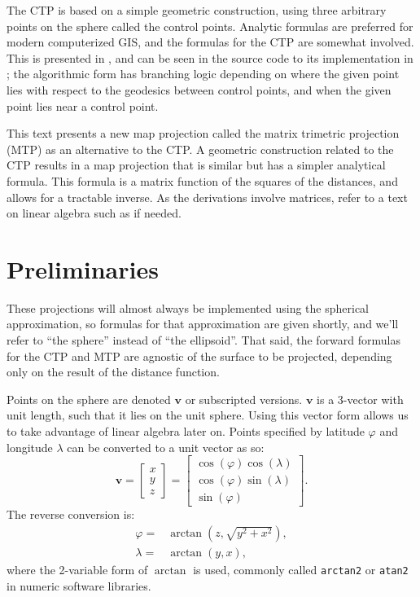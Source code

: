 \documentclass[]{interact}
\begin{document}
The CTP is based on a simple geometric construction, using three arbitrary
points on the sphere called the control points. Analytic formulas are preferred
for modern computerized GIS, and the formulas for the CTP are somewhat involved.
This is presented in \citet{christensen}, and can be seen in the source code to
its implementation in \citet{proj}; the algorithmic form has branching logic
depending on where the given point lies with respect to the geodesics between
control points, and when the given point lies near a control point.

This text presents a new map projection called the matrix trimetric projection
(MTP) as an alternative to the CTP. A geometric construction related to the
CTP results in a map projection that is similar but has a simpler analytical
formula. This formula is a matrix function of the squares of the distances, and
allows for a tractable inverse. As the derivations involve matrices,
refer to a text on linear algebra such as \citet{strang80} if needed.

\section{Preliminaries}
These projections will almost always be implemented using the spherical
approximation, so formulas for that approximation are given shortly, and we'll
refer to ``the sphere'' instead of ``the ellipsoid''. That said, the forward
formulas for the CTP and MTP are agnostic of the surface to be projected,
depending only on the result of the distance function.

Points on the sphere are denoted $\mathbf v$ or subscripted versions.
$\mathbf v$ is a 3-vector with unit length, such that it lies on the unit
sphere. Using this vector form allows us to take advantage of linear algebra
later on. Points specified by latitude $\varphi$ and longitude $\lambda$
can be converted to a unit vector as so:\citep{kent}
\begin{equation}
\mathbf v =
\begin{bmatrix*}
  x \\ y \\ z
\end{bmatrix*}
=
\begin{bmatrix*}
 \cos(\varphi) \cos(\lambda) \\
 \cos(\varphi) \sin(\lambda) \\
 \sin(\varphi)
\end{bmatrix*}.
\end{equation}
The reverse conversion is:
\begin{equation}\begin{split}
  \varphi =& \arctan\left(z, \sqrt{y^2 + x^2}\right), \\
  \lambda =& \arctan\left(y, x\right),
\end{split}\end{equation}
where the 2-variable form of $\arctan$ is used,
commonly called \texttt{arctan2}
or \texttt{atan2} in numeric software libraries.
\end{document}
